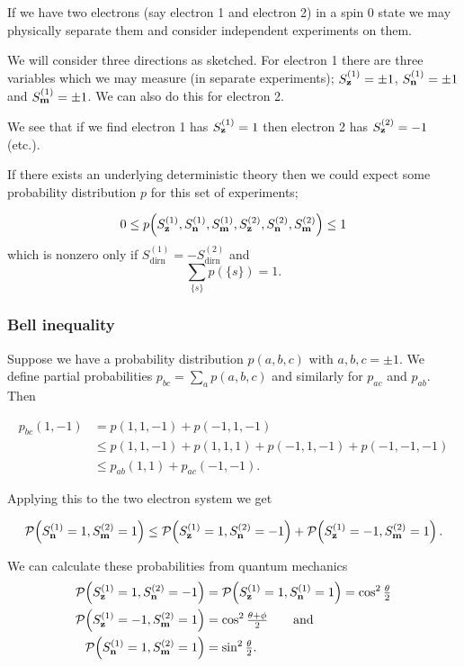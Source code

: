 \documentclass{notes}
\newcommand{\cP}{\mathcal{P}}
\begin{document}
If we have two electrons (say electron 1 and electron 2) in a spin 0
state we may physically separate them and consider independent experiments
on them.

We will consider three directions as sketched.  For electron 1 there are
three variables which we may measure (in separate experiments);
$S^{(1)}_{\mathbf{z}} = \pm 1$, $S^{(1)}_{\mathbf{n}} = \pm 1$ and $S^{(1)}_{\mathbf{m}}
= \pm 1$.  We can also do this for electron 2.

We see that if we find electron 1 has $S^{(1)}_{\mathbf{z}} = 1$ then
electron 2 has $S^{(2)}_{\mathbf{z}} = -1$ (etc.).

If there exists an underlying deterministic theory then we could
expect some probability distribution $p$ for this set of experiments;

\[
0 \le p\!\left( S^{(1)}_{\mathbf{z}}, S^{(1)}_{\mathbf{n}}, S^{(1)}_{\mathbf{m}},
S^{(2)}_{\mathbf{z}}, S^{(2)}_{\mathbf{n}}, S^{(2)}_{\mathbf{m}}\right)
 \le 1
\]
which is nonzero only if $S^{(1)}_{\text{dirn}} = - S^{(2)}_{\text{dirn}}$
and
\[
\sum_{\{ s \}} p(\{ s \}) = 1.
\]

\subsubsection*{Bell inequality}

Suppose we have a probability distribution $p(a,b,c)$ with $a,b,c = \pm 1$.
We define partial probabilities $p_{bc} = \sum_a p(a,b,c)$ and similarly
for $p_{ac}$ and $p_{a b}$.  Then

\begin{align*}
p_{bc}(1,-1) & = p(1,1,-1) + p(-1,1,-1) \\
& \le p(1,1,-1) + p(1,1,1) + p(-1,1,-1) + p(-1,-1,-1) \\
&\le p_{ab}(1,1) + p_{ac}(-1,-1).
\end{align*}

Applying this to the two electron system we get

\[
\cP\! \left(S^{(1)}_\vect{n} = 1, S^{(2)}_\vect{m} = 1 \right)
\le \cP\!\left(S^{(1)}_\vect{z} = 1, S^{(2)}_\vect{n} = -1 \right)
+ \cP\!\left(S^{(1)}_\vect{z} = -1, S^{(2)}_\vect{m} = 1\right).
\]

We can calculate these probabilities from quantum mechanics
\begin{align*}
\cP\!\left(S^{(1)}_\vect{z} = 1, S^{(2)}_\vect{n} = -1\right) &=
\cP\!\left(S^{(1)}_\vect{z} = 1, S^{(1)}_\vect{n} = 1 \right)
= \cos^2 \tfrac{\theta}{2} \\
\cP\!\left(S^{(1)}_\vect{z} = -1, S^{(2)}_\vect{m} = 1\right) &=
\cos^2 \tfrac{\theta + \phi}{2} \qquad \text{and} \\
\cP\!\left( S^{(1)}_\vect{n} = 1, S^{(2)}_\vect{m} = 1\right) &=
\sin^2 \tfrac{\theta}{2}.
\end{align*}
\end{document}
